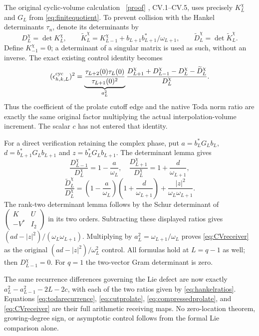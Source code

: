 \documentclass[11pt]{article}
\begin{document}
The original cyclic-volume calculation \cite{CV}%
~\href{https://github.com/KokunoYumeto/zeta-function-research-reader/blob/487253b5b01851da5b9b98af4e146fecf1fab902/workbenches/splitzero-tandem/continuations/20260913-toda/tex/cyclic_control_determinant_increments.tex\#L1}{[proof]}%
{}, CV.1--CV.5,
uses precisely $K_L^\chi$ and $G_L$ from
\eqref{eq:finitequotient}. To prevent collision with the
Hankel determinants $\tau_n$, denote its determinants by
\[
 D_L^\chi=\det K_L^\chi,\qquad
 \widetilde K_L^\chi=K_{L-1}^\chi
                     +b_{L+1}b_{L+1}^*/\omega_{L+1},
 \qquad \widetilde D_L^\chi=\det\widetilde K_L^\chi.
\]
Define $K_{-1}^\chi=0$; a determinant of a singular
matrix is used as such, without an inverse.
The exact existing control identity becomes
\begin{equation}\label{eq:CVreceiver}
 (\epsilon_{h,k,L}^{\rm cyc})^2
 =\underbrace{\frac{\tau_{L+2}(0)\tau_L(0)}
                         {\tau_{L+1}(0)^2}}_{a_L^2}
   \frac{D_{L+1}^\chi+D_{L-1}^\chi
                    -D_L^\chi-\widetilde D_L^\chi}{D_L^\chi}.
\end{equation}
Thus the coefficient of the prolate cutoff edge and
the native Toda norm ratio are exactly the same original
factor multiplying the actual interpolation-volume
increment. The scalar $c$ has not entered that identity.

For a direct verification retaining the complex phase,
put $a=b_L^*G_Lb_L$, $d=b_{L+1}^*G_Lb_{L+1}$ and
$z=b_L^*G_Lb_{L+1}$. The determinant lemma gives
\[
 \frac{D_{L-1}^\chi}{D_L^\chi}=1-\frac a{\omega_L},
 \quad
 \frac{D_{L+1}^\chi}{D_L^\chi}=1+\frac d{\omega_{L+1}},
\]
\[
 \frac{\widetilde D_L^\chi}{D_L^\chi}
 =\left(1-\frac a{\omega_L}\right)
  \left(1+\frac d{\omega_{L+1}}\right)
                +\frac{|z|^2}{\omega_L\omega_{L+1}}.
\]
The rank-two determinant lemma follows by the
Schur determinant of
$\left(\begin{smallmatrix}K&U\\-V^*&I_2\end{smallmatrix}\right)$
in its two orders. Subtracting these displayed ratios
gives $(ad-|z|^2)/(\omega_L\omega_{L+1})$.
Multiplying by $a_L^2=\omega_{L+1}/\omega_L$
proves \eqref{eq:CVreceiver} as the original
$(ad-|z|^2)/\omega_L^2$ control. All formulas hold
at $L=q-1$ as well; then $D_{L-1}^\chi=0$.
For $q=1$ the two-vector Gram determinant is zero.

The same recurrence differences governing the Lie
defect are now exactly
$a_L^2-a_{L-1}^2-2L-2c$, with each of the two
ratios given by \eqref{eq:hankelratios}. Equations
\eqref{eq:todarecurrence}, \eqref{eq:cutprolate},
\eqref{eq:compressedprolate}, and \eqref{eq:CVreceiver}
are their full arithmetic receiving maps.
No zero-location theorem, growing-degree sign, or
asymptotic control follows from the formal Lie
comparison alone.
\end{document}
